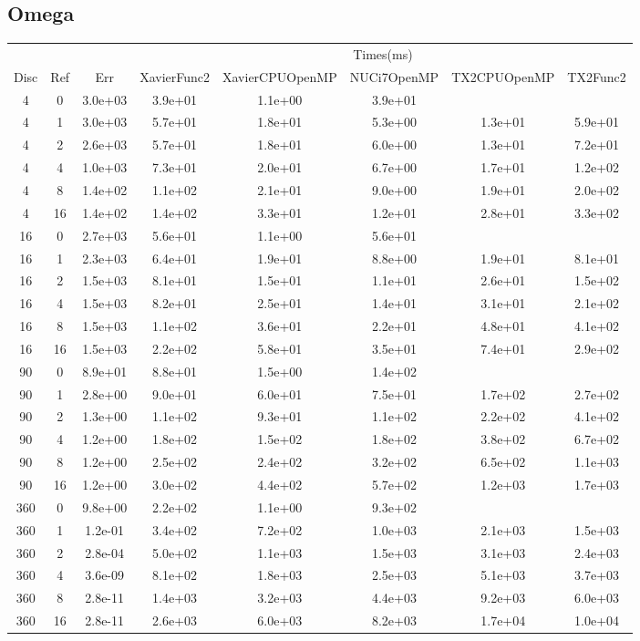 \begin{landscape}
\subsection{Omega}
\begin{center}
\begin{tabular}{c|c|c|c|c|c|c|c}
	&&&\multicolumn{5}{c}{Times(ms)}\\
	Disc&Ref&Err&XavierFunc2&XavierCPUOpenMP&NUCi7OpenMP&TX2CPUOpenMP&TX2Func2\\
\hline
4&0&3.0e+03&3.9e+01&1.1e+00&3.9e+01\\
4&1&3.0e+03&5.7e+01&1.8e+01&5.3e+00&1.3e+01&5.9e+01\\
4&2&2.6e+03&5.7e+01&1.8e+01&6.0e+00&1.3e+01&7.2e+01\\
4&4&1.0e+03&7.3e+01&2.0e+01&6.7e+00&1.7e+01&1.2e+02\\
4&8&1.4e+02&1.1e+02&2.1e+01&9.0e+00&1.9e+01&2.0e+02\\
4&16&1.4e+02&1.4e+02&3.3e+01&1.2e+01&2.8e+01&3.3e+02\\
\hline
16&0&2.7e+03&5.6e+01&1.1e+00&5.6e+01\\
16&1&2.3e+03&6.4e+01&1.9e+01&8.8e+00&1.9e+01&8.1e+01\\
16&2&1.5e+03&8.1e+01&1.5e+01&1.1e+01&2.6e+01&1.5e+02\\
16&4&1.5e+03&8.2e+01&2.5e+01&1.4e+01&3.1e+01&2.1e+02\\
16&8&1.5e+03&1.1e+02&3.6e+01&2.2e+01&4.8e+01&4.1e+02\\
16&16&1.5e+03&2.2e+02&5.8e+01&3.5e+01&7.4e+01&2.9e+02\\
\hline
90&0&8.9e+01&8.8e+01&1.5e+00&1.4e+02\\
90&1&2.8e+00&9.0e+01&6.0e+01&7.5e+01&1.7e+02&2.7e+02\\
90&2&1.3e+00&1.1e+02&9.3e+01&1.1e+02&2.2e+02&4.1e+02\\
90&4&1.2e+00&1.8e+02&1.5e+02&1.8e+02&3.8e+02&6.7e+02\\
90&8&1.2e+00&2.5e+02&2.4e+02&3.2e+02&6.5e+02&1.1e+03\\
90&16&1.2e+00&3.0e+02&4.4e+02&5.7e+02&1.2e+03&1.7e+03\\
\hline
360&0&9.8e+00&2.2e+02&1.1e+00&9.3e+02\\
360&1&1.2e-01&3.4e+02&7.2e+02&1.0e+03&2.1e+03&1.5e+03\\
360&2&2.8e-04&5.0e+02&1.1e+03&1.5e+03&3.1e+03&2.4e+03\\
360&4&3.6e-09&8.1e+02&1.8e+03&2.5e+03&5.1e+03&3.7e+03\\
360&8&2.8e-11&1.4e+03&3.2e+03&4.4e+03&9.2e+03&6.0e+03\\
360&16&2.8e-11&2.6e+03&6.0e+03&8.2e+03&1.7e+04&1.0e+04\\
\hline
\end{tabular}
\end{center}
\end{landscape}





